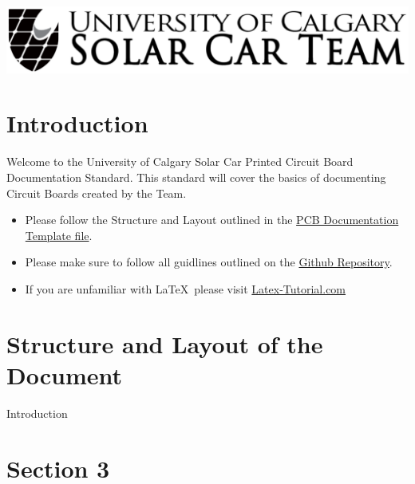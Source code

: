 \begin{titlepage}
    \includegraphics[width=\textwidth]{../../Images/Logos/logo-wide.png}\\[1cm] %
     
    
    \vfill %
  
  \end{titlepage}
  
  
  \tableofcontents
  \listoffigures
  \listoftables
  
  
  \section{Introduction}
  Welcome to the University of Calgary Solar Car Printed Circuit Board Documentation Standard. This standard will cover the basics of documenting Circuit Boards created by the Team.
  \begin{itemize}
    \item Please follow the Structure and Layout outlined in the \href{run:../../Template/PCB-Documentation-Template/PCB-Documentation-Template.pdf}{PCB Documentation Template file}.
    \item Please make sure to follow all guidlines outlined on the \href{https://github.com/UCSolarCarTeam/Documentation-Electrical}{Github Repository}.
    \item If you are unfamiliar with \LaTeX\ please visit \href{https://www.latex-tutorial.com/tutorials/}{Latex-Tutorial.com}
  \end{itemize}
  
  \section{Structure and Layout of the Document}
    Introduction
  
  \section{Section 3}
  
  
  
  
  \begin{versionhistory}
  \end{versionhistory}


